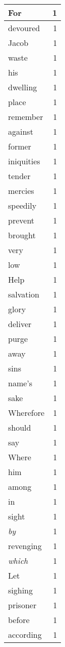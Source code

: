 \begin{center}
\begin{longtable}{l|r}
For & 1 \\ \hline
devoured & 1 \\ \hline
Jacob & 1 \\ \hline
waste & 1 \\ \hline
his & 1 \\ \hline
dwelling & 1 \\ \hline
place & 1 \\ \hline
remember & 1 \\ \hline
against & 1 \\ \hline
former & 1 \\ \hline
iniquities & 1 \\ \hline
tender & 1 \\ \hline
mercies & 1 \\ \hline
speedily & 1 \\ \hline
prevent & 1 \\ \hline
brought & 1 \\ \hline
very & 1 \\ \hline
low & 1 \\ \hline
Help & 1 \\ \hline
salvation & 1 \\ \hline
glory & 1 \\ \hline
deliver & 1 \\ \hline
purge & 1 \\ \hline
away & 1 \\ \hline
sins & 1 \\ \hline
name's & 1 \\ \hline
sake & 1 \\ \hline
Wherefore & 1 \\ \hline
should & 1 \\ \hline
say & 1 \\ \hline
Where & 1 \\ \hline
him & 1 \\ \hline
among & 1 \\ \hline
in & 1 \\ \hline
sight & 1 \\ \hline
\emph{by} & 1 \\ \hline
revenging & 1 \\ \hline
\emph{which} & 1 \\ \hline
Let & 1 \\ \hline
sighing & 1 \\ \hline
prisoner & 1 \\ \hline
before & 1 \\ \hline
according & 1 \\ \hline

\end{longtable}
\end{center}
